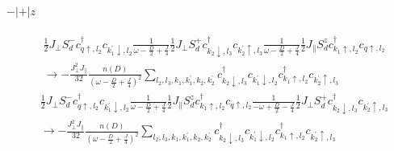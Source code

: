 \documentclass[12pt]{revtex4-2}
\begin{document}
\paragraph{\(-|+|z\)}
\begin{equation}\begin{aligned}
	&\frac{1}{2}J_\perp S_d^- c^\dagger_{q \uparrow, l_2}c_{k_1^\prime \downarrow, l_2}\frac{1}{\omega - \frac{D}{2} + \frac{J}{4}}\frac{1}{2}J_\perp S_d^+ c^\dagger_{k_2 \downarrow, l_3}c_{k_2^\prime \uparrow, l_3} \frac{1}{\omega - \frac{D}{2} + \frac{J}{4}} \frac{1}{2}J_\parallel S_d^z c^\dagger_{k_1 \uparrow, l_2} c_{q \uparrow, l_2} \\
	&\longrightarrow -\frac{J_\perp^2 J_\parallel}{32} \frac{n(D)}{\left(\omega - \frac{D}{2} + \frac{J}{4}\right)^2}\sum_{l_2, l_3, k_1,k_1^\prime,k_2,k_2^\prime}c^\dagger_{k_2 \downarrow, l_3}c_{k_1^\prime \downarrow, l_2}c^\dagger_{k_1 \uparrow, l_2}c_{k_2^\prime \uparrow, l_3}
\end{aligned}\end{equation}
\begin{equation}\begin{aligned}
	&\frac{1}{2}J_\perp S_d^- c^\dagger_{q \uparrow, l_2}c_{k_1^\prime \downarrow, l_2} \frac{1}{\omega - \frac{D}{2} + \frac{J}{4}} \frac{1}{2}J_\parallel S_d^z c^\dagger_{k_1 \uparrow, l_2} c_{q \uparrow, l_2}\frac{1}{-\omega + \frac{D}{2} - \frac{J}{4}}\frac{1}{2}J_\perp S_d^+ c^\dagger_{k_2 \downarrow, l_3}c_{k_2^\prime \uparrow, l_3} \\
	&\longrightarrow -\frac{J_\perp^2 J_\parallel}{32} \frac{n(D)}{\left(\omega - \frac{D}{2} + \frac{J}{4}\right)^2}\sum_{l_2, l_3, k_1,k_1^\prime,k_2,k_2^\prime}c^\dagger_{k_2 \downarrow, l_3}c_{k_1^\prime \downarrow, l_2}c^\dagger_{k_1 \uparrow, l_2}c_{k_2^\prime \uparrow, l_3}
\end{aligned}\end{equation}
\end{document}
